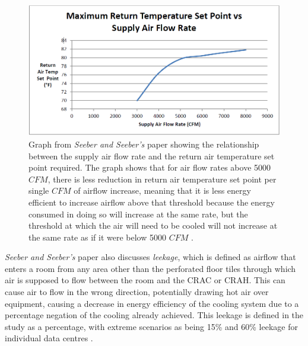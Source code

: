 \begin{figure}[H]
\centering
\includegraphics[width=5in]{Resources//SeeberAndSeeberAirflowEffectivenessGraph.png}
\caption{Graph from \emph{Seeber and Seeber's} paper showing the relationship between the supply air flow rate and the return air temperature set point required. The graph shows that for air flow rates above 5000 $CFM$, there is less reduction in return air temperature set point per single $CFM$ of airflow increase, meaning that it is less energy efficient to increase airflow above that threshold because the energy consumed in doing so will increase at the same rate, but the threshold at which the air will need to be cooled will not increase at the same rate as if it were below 5000 $CFM$ \cite[The Numbers: How Much Can You Really Save Through Environmental Optimization?]{SeeberAndSeeberImprovingDataCenterEnergyEfficiencyThroughEnvironmentalOptimization}.}
\label{fig:SeeberAndSeeberAirflowEffectivenessGraph}
\end{figure}

\emph{Seeber and Seeber's} paper also discusses \emph{leekage}, which is defined as airflow that enters a room from any area other than the perforated floor tiles through which air is supposed to flow between the room and the \gls{CRAC} or \gls{CRAH}. This can cause air to flow in the wrong direction, potentially drawing hot air over equipment, causing a decrease in energy efficiency of the cooling system due to a percentage negation of the cooling already achieved. This leekage is defined in the study as a percentage, with extreme scenarios as being 15\% and 60\% leekage for individual \gls{data centre}s \cite[Optimizing Air Temperature Set Points and Air Flows Can Shrink PUE Numbers]{SeeberAndSeeberImprovingDataCenterEnergyEfficiencyThroughEnvironmentalOptimization}.


